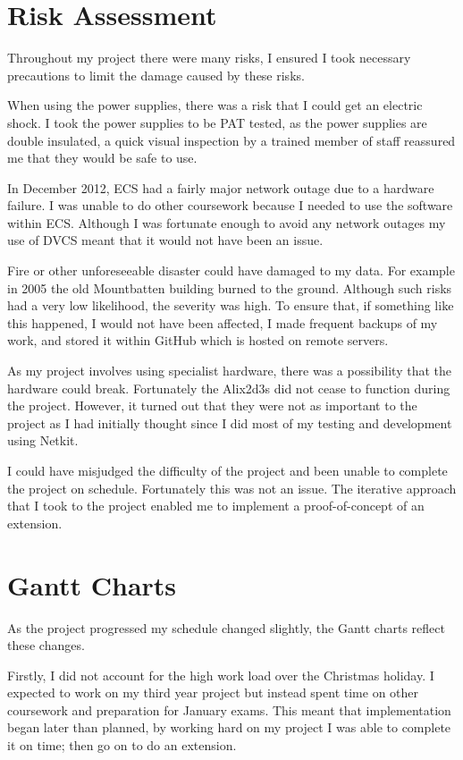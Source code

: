 \documentclass[12pt,a4paper,twoside]{report}
\begin{document}
\section{Risk Assessment}
Throughout my project there were many risks, I ensured I took necessary
precautions to limit the damage caused by these risks.

When using the power supplies, there was a risk that I could get an electric
shock. I took the power supplies to be PAT tested, as the power supplies are
double insulated, a quick visual inspection by a trained member of staff
reassured me that they would be safe to use.

In December 2012, ECS had a fairly major network outage due to a hardware
failure. I was unable to do other coursework because I needed to use the
software within ECS\@. Although I was fortunate enough to avoid any network
outages my use of DVCS meant that it would not have been an issue.

Fire or other unforeseeable disaster could have damaged to my data. For example
in 2005 the old Mountbatten building burned to the ground. Although such risks
had a very low likelihood, the severity was high.  To ensure that, if something
like this happened, I would not have been affected, I made frequent backups of
my work, and stored it within GitHub which is hosted on remote servers.

As my project involves using specialist hardware, there was a possibility that
the hardware could break. Fortunately the Alix2d3s did not cease to function
during the project. However, it turned out that they were not as important to
the project as I had initially thought since I did most of my testing and
development using Netkit.

I could have misjudged the difficulty of the project and been unable to
complete the project on schedule. Fortunately this was not an issue. The
iterative approach that I took to the project enabled me to implement a
proof-of-concept of an extension.  

\section{Gantt Charts}
As the project progressed my schedule changed slightly, the Gantt charts
reflect these changes.

Firstly, I did not account for the high work load over the Christmas holiday. I
expected to work on my third year project but instead spent time on other
coursework and preparation for January exams. This meant that implementation
began later than planned, by working hard on my project I was able to complete
it on time; then go on to do an extension. 
\end{document}
